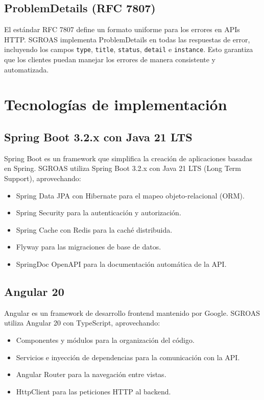 \subsection{ProblemDetails (RFC 7807)}
\label{sec:rfc7807}

El estándar RFC 7807 \cite{rfc7807} define un formato uniforme para los errores en APIs HTTP. SGROAS implementa ProblemDetails en todas las respuestas de error, incluyendo los campos \texttt{type}, \texttt{title}, \texttt{status}, \texttt{detail} e \texttt{instance}. Esto garantiza que los clientes puedan manejar los errores de manera consistente y automatizada.

\section{Tecnologías de implementación}
\label{sec:tech}

\subsection{Spring Boot 3.2.x con Java 21 LTS}
\label{sec:spring}

Spring Boot \cite{springboot} es un framework que simplifica la creación de aplicaciones basadas en Spring. SGROAS utiliza Spring Boot 3.2.x con Java 21 LTS (Long Term Support), aprovechando:
\begin{itemize}
  \item Spring Data JPA con Hibernate para el mapeo objeto-relacional (ORM).
  \item Spring Security para la autenticación y autorización.
  \item Spring Cache con Redis para la caché distribuida.
  \item Flyway para las migraciones de base de datos.
  \item SpringDoc OpenAPI para la documentación automática de la API.
\end{itemize}

\subsection{Angular 20}
\label{sec:angular}

Angular \cite{angular} es un framework de desarrollo frontend mantenido por Google. SGROAS utiliza Angular 20 con TypeScript, aprovechando:
\begin{itemize}
  \item Componentes y módulos para la organización del código.
  \item Servicios e inyección de dependencias para la comunicación con la API.
  \item Angular Router para la navegación entre vistas.
  \item HttpClient para las peticiones HTTP al backend.
\end{itemize}

